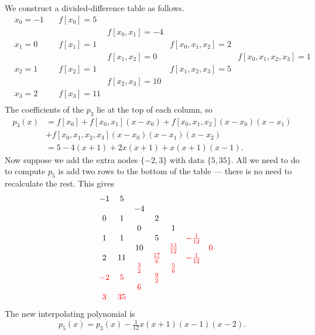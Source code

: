\documentclass[
  letterpaper,
  DIV=11,
  numbers=noendperiod]{scrreprt}
\newenvironment{fbxSimple}[3]{\begin{tcolorbox}[enhanced, breakable,%
attach boxed title to top*={xshift=1.4pt},
boxed title style={boxrule=0.0mm, fuzzy shadow={1pt}{-1pt}{0mm}{0.1mm}{gray}, arc=.3em, rounded corners=east, sharp corners=west}, colframe=#1-color2, colbacktitle=#1-color1, colback = white, coltitle=black,  titlerule=0mm, toprule=0pt, bottomrule=.7pt, leftrule=.3em, rightrule=.7pt, outer arc=.3em,  	left=.5em, right=.5em, bottomtitle=1mm, toptitle=1mm,title=\textbf{#2}\hspace{0.5em}{#3}]}
{\end{tcolorbox}}
\begin{document}
\label{construct-the-newton-polynomial-at-the-nodes--1012-and-with-corresponding-function-values-51111}
\begin{fbxSimple}{eg}{Example 2.6: }{Construct the Newton polynomial at the nodes \(\{-1,0,1,2\}\) and with corresponding function values \(\{5,1,1,11\}\)}
\label{construct-the-newton-polynomial-at-the-nodes--1012-and-with-corresponding-function-values-51111}
We construct a divided-difference table as follows. \[
\begin{matrix}
&x_0=-1 \quad &f[x_0]=5 & & &\\
& & &f[x_0,x_1]=-4 & &\\
&x_1=0 \quad &f[x_1]=1 & &f[x_0,x_1,x_2]=2 &\\
& & &f[x_1,x_2]=0 & &f[x_0,x_1,x_2,x_3]=1\\
&x_2=1 \quad &f[x_2]=1 & &f[x_1,x_2,x_3]=5 &\\
& & &f[x_2,x_3]=10 & &\\
&x_3=2 \quad &f[x_3]=11 & & &\\
\end{matrix}
\] The coefficients of the \(p_3\) lie at the top of each column, so \[
\begin{aligned}
p_3(x) &= f[x_0] + f[x_0,x_1](x-x_0) + f[x_0,x_1,x_2](x-x_0)(x-x_1)\\
& + f[x_0,x_1,x_2,x_3](x-x_0)(x-x_1)(x-x_2)\\
&=5 - 4(x+1) + 2x(x+1) + x(x+1)(x-1).
\end{aligned}
\] Now suppose we add the extra nodes \(\{-2,3\}\) with data
\(\{5,35\}\). All we need to do to compute \(p_5\) is add two rows to
the bottom of the table --- there is no need to recalculate the rest.
This gives \[
\begin{matrix}
&-1  &5 & & & & &\\
& & &-4 & & & &\\
&0  &1 & &2 & & &\\
& & &0 & &1 & &\\
&1  &1 & &5 & &\textcolor{red}{-\tfrac1{12}} &\\
& & &10 & &\textcolor{red}{\tfrac{13}{12}} & &\textcolor{red}{0}\\
&2 &11 & &\textcolor{red}{\tfrac{17}{6}} & &\textcolor{red}{-\tfrac1{12}}\\
& & &\textcolor{red}{\tfrac{3}{2}} & &\textcolor{red}{\tfrac{5}{6}} & &\\
&\textcolor{red}{-2} &\textcolor{red}{5} & &\textcolor{red}{\tfrac92} & &&\\
& & &\textcolor{red}{6} & & & &\\
&\textcolor{red}{3}  &\textcolor{red}{35} & & & & &\\
\end{matrix}
\] The new interpolating polynomial is \[
p_5(x) = p_3(x) - \tfrac{1}{12}x(x+1)(x-1)(x-2).
\]

\end{fbxSimple}
\end{document}
